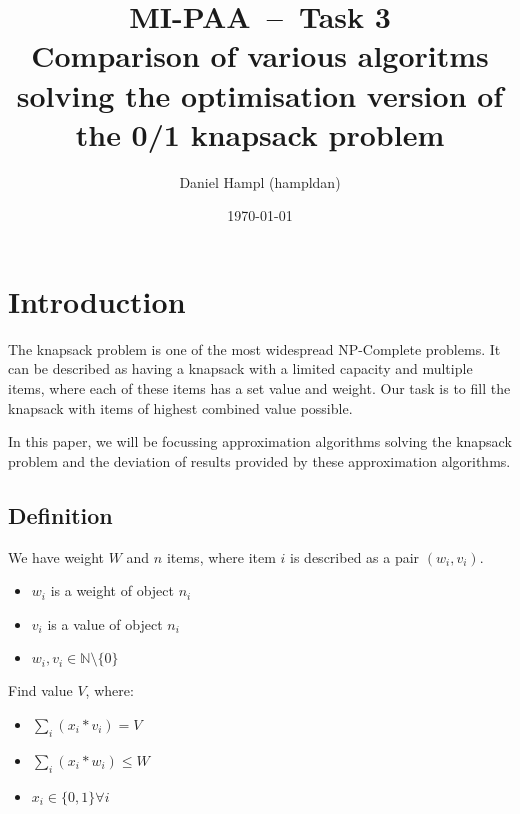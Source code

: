 
\RequirePackage{todonotes}
\RequirePackage[parfill]{parskip}
\RequirePackage[margin=2.8cm]{geometry}
\RequirePackage{hyperref}
\RequirePackage[english]{babel}
\RequirePackage{pgfplots}
\RequirePackage{listings}
\RequirePackage{amsfonts}
\RequirePackage{subfiles}
\RequirePackage{mathtools}

\providecommand{\tightlist}{%
  \setlength{\itemsep}{0pt}\setlength{\parskip}{0pt}}


\title{\textbf{MI-PAA~--~Task 3}\\
Comparison of various algoritms solving the optimisation version of the 0/1 knapsack problem}
\author{Daniel Hampl (hampldan)}
\date{\today}
\maketitle

\tableofcontents
\newpage

\section{Introduction}
The knapsack problem is one of the most widespread NP-Complete problems. It can be described as having a knapsack with a limited capacity and multiple items, where each of these items has a set value and weight. Our task is to fill the knapsack with items of highest combined value possible.

In this paper, we will be focussing approximation algorithms solving the knapsack problem and the deviation of results provided by these approximation algorithms.

\subsection{Definition\cite{WEBSITE:knapsackDef}}
We have weight $W$ and $n$ items, where item $i$ is described as a pair $(w_i, v_i)$.

\begin{itemize}
    \item $w_i$ is a weight of object $n_i$
    \item $v_i$ is a value of object $n_i$
    \item $w_i, v_i \in \mathbb{N}\setminus\{0\}$
\end{itemize}

Find value $V$, where:

\begin{itemize}
    \item $\sum_i(x_i*v_i) = V$
    \item $\sum_i(x_i*w_i) \leq W$
    \item $x_i \in \{0,1\} \forall i$
\end{itemize}

